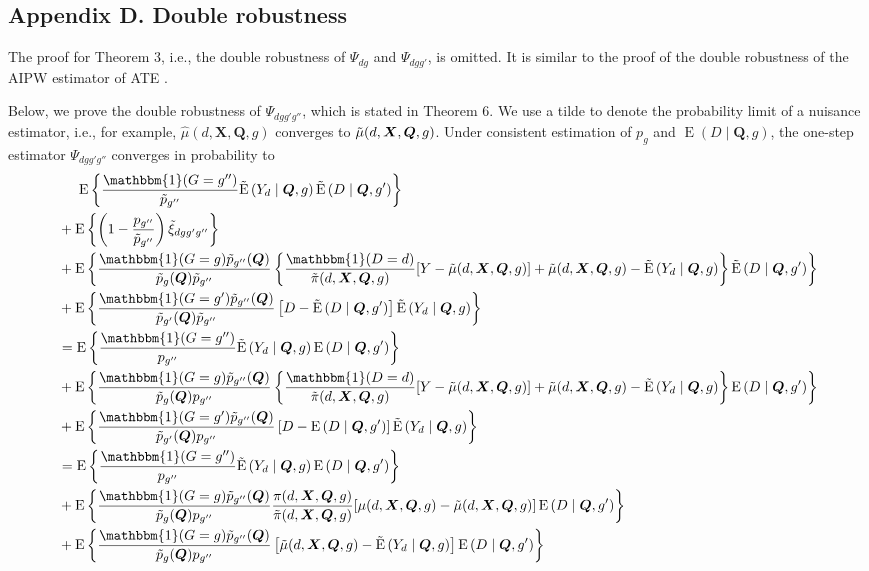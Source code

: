 \documentclass[12pt,a4paper]{article}
\newcommand{\E}{\operatorname{E}}
\def\X{{\boldsymbol X}}
\def\Q{{\boldsymbol Q}}
\def\one{\mathbbm{1}}
\begin{document}
\subsection*{Appendix D. Double robustness}
The proof for Theorem 3, i.e., the double robustness of $\Psi_{dg}$ and $\Psi_{dgg'}$, is omitted. It is similar to the proof of the double robustness of the AIPW estimator of ATE \citep{robins_estimation_1994, tsiatis_semiparametric_2006}.

Below, we prove the double robustness of $\Psi_{dgg'g''}$, which is stated in Theorem 6. 
We use a tilde to denote the probability limit of a nuisance estimator, i.e., for example, $\hat{\mu}(d,\X,\Q,g)$ converges to $\Tilde{\mu}(d,\X,\Q,g)$. 
Under consistent estimation of $p_g$ and $\E(D \mid \Q, g)$, the one-step estimator $\Psi_{dgg'g''}$ converges in probability to 
\begin{align*}
    &\phantom{{}={}} \E \left\{ \frac{\one(G=g'')}{\Tilde{p}_{g''}} \Tilde{\E} \left(Y_d \mid \Q, g \right) \Tilde{\E} \left(D \mid \Q, g' \right) \right\} \\
    &+ \E \left\{ \left( 1- \frac{p_{g''}}{\Tilde{p}_{g''}} \right) \Tilde{\xi}_{dgg'g''} \right\} \\
    &+ \E \left\{ \frac{\one(G=g) \Tilde{p}_{g''}(\Q)}{\Tilde{p}_g(\Q)\Tilde{p}_{g''}} \left\{ \frac{\one(D=d)}{\Tilde{\pi}(d,\X,\Q,g)} [Y-\Tilde{\mu}(d,\X,\Q,g)]+\Tilde{\mu}(d,\X,\Q,g) - \Tilde{\E} \left(Y_d \mid \Q,g \right) \right\} \Tilde{\E} \left(D \mid \Q,g' \right) \right\} \\
    &+ \E \left\{ \frac{\one(G=g')\Tilde{p}_{g''}(\Q)}{\Tilde{p}_{g'}(\Q)\Tilde{p}_{g''}} \left[ D-\Tilde{\E} \left(D \mid \Q, g' \right) \right] \Tilde{\E}\left( Y_d \mid \Q, g \right) \right\} 
    \\
    &= \E \left\{ \frac{\one(G=g'')}{p_{g''}} \Tilde{\E} \left(Y_d \mid \Q, g \right) \E \left(D \mid \Q, g' \right) \right\} \\
    &+ \E \left\{ \frac{\one(G=g) \Tilde{p}_{g''}(\Q)}{\Tilde{p}_g(\Q)p_{g''}} \left\{ \frac{\one(D=d)}{\Tilde{\pi}(d,\X,\Q,g)} [Y-\Tilde{\mu}(d,\X,\Q,g)]+\Tilde{\mu}(d,\X,\Q,g) - \Tilde{\E} \left(Y_d \mid \Q,g \right) \right\} \E \left(D \mid \Q,g' \right) \right\} \\
    &+ \E \left\{ \frac{\one(G=g')\Tilde{p}_{g''}(\Q)}{\Tilde{p}_{g'}(\Q) p_{g''}} \left[ D-\E \left(D \mid \Q, g' \right) \right] \Tilde{\E}\left( Y_d \mid \Q, g \right) \right\} \\
    &= \E \left\{ \frac{\one(G=g'')}{p_{g''}} \Tilde{\E} \left(Y_d \mid \Q, g \right) \E \left(D \mid \Q, g' \right) \right\} \\
    &+ \E \left\{ \frac{\one(G=g) \Tilde{p}_{g''}(\Q)}{\Tilde{p}_g(\Q)p_{g''}}  \frac{\pi(d,\X,\Q,g)}{\Tilde{\pi}(d,\X,\Q,g)} [\mu(d,\X,\Q,g)-\Tilde{\mu}(d,\X,\Q,g)]  \E \left(D \mid \Q,g' \right) \right\} \\
    &+ \E  \left\{ \frac{\one(G=g) \Tilde{p}_{g''}(\Q)}{\Tilde{p}_g(\Q)p_{g''}} \left[ \Tilde{\mu}(d,\X,\Q,g) - \Tilde{\E} \left(Y_d \mid \Q,g \right) \right]  \E \left(D \mid \Q,g' \right) \right\}
\end{align*}
\end{document}
